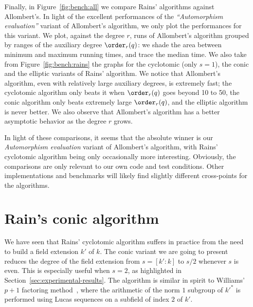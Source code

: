 Finally, in Figure~\ref{fig:bench:all} we compare Rains' algorithms
against Allombert's. %
In light of the excellent performances of the \emph{``Automorphism
  evaluation''} variant of Allombert's algorithm, we only plot the
performances for this variant. %
We plot, against the degree $r$, runs of Allombert's algorithm grouped
by ranges of the auxiliary degree $\order_r(q)$: we shade the area
between minimum and maximum running times, and trace the median
time. %
We also take from Figure~\ref{fig:bench:rains} the graphs for the
cyclotomic (only $s=1$), the conic and the elliptic variants of Rains'
algorithm. %
We notice that Allombert's algorithm, even with relatively large
auxiliary degrees, is extremely fast; the cyclotomic algorithm only
beats it when $\order_r(q)$ goes beyond 10 to 50, the conic algorithm
only beats extremely large $\order_r(q)$, and the elliptic algorithm
is never better. %
We also observe that Allombert's algorithm has a better asymptotic
behavior as the degree $r$ grows.

In light of these comparisons, it seems that the absolute winner is
our \emph{Automorphism evaluation} variant of Allombert's algorithm,
with Rains' cyclotomic algorithm being only occasionally more
interesting. %
Obviously, the comparisons are only relevant to our own code and test
conditions. Other implementations and benchmarks will likely find
slightly different cross-points for the algorithms.




\section{Rain's conic algorithm}
\label{app:rains-vars}

We have seen that Rains' cyclotomic algorithm suffers in practice from
the need to build a field extension $k'$ of $k$. %
The conic variant we are going to present reduces the degree of the
field extension from $s=[k':k]$ to $s/2$ whenever $s$ is even. %
This is especially useful when $s=2$, as highlighted in
Section~\ref{sec:experimental-results}. %
The algorithm is similar in spirit to Williams' $p+1$ factoring
method~\cite{williams1982}, where the arithmetic of the norm $1$
subgroup of ${k'}^*$ is performed using Lucas sequences on a subfield
of index $2$ of $k'$.

